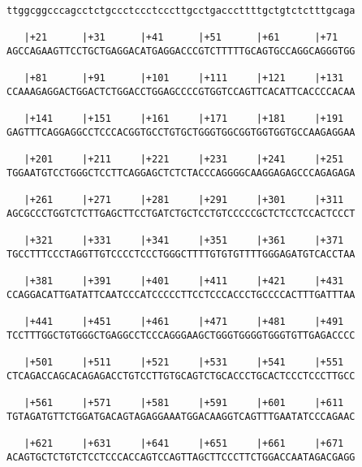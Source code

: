 \documentclass{article}
\begin{document}
\begin{Verbatim}
ttggcggcccagcctctgccctccctcccttgcctgacccttttgctgtctctttgcaga
                                                            
   |+21      |+31      |+41      |+51      |+61      |+71   
AGCCAGAAGTTCCTGCTGAGGACATGAGGACCCGTCTTTTTGCAGTGCCAGGCAGGGTGG
                                                            
   |+81      |+91      |+101     |+111     |+121     |+131  
CCAAAGAGGACTGGACTCTGGACCTGGAGCCCCGTGGTCCAGTTCACATTCACCCCACAA
                                                            
   |+141     |+151     |+161     |+171     |+181     |+191  
GAGTTTCAGGAGGCCTCCCACGGTGCCTGTGCTGGGTGGCGGTGGTGGTGCCAAGAGGAA
                                                            
   |+201     |+211     |+221     |+231     |+241     |+251  
TGGAATGTCCTGGGCTCCTTCAGGAGCTCTCTACCCAGGGGCAAGGAGAGCCCAGAGAGA
                                                            
   |+261     |+271     |+281     |+291     |+301     |+311  
AGCGCCCTGGTCTCTTGAGCTTCCTGATCTGCTCCTGTCCCCCGCTCTCCTCCACTCCCT
                                                            
   |+321     |+331     |+341     |+351     |+361     |+371  
TGCCTTTCCCTAGGTTGTCCCCTCCCTGGGCTTTTGTGTGTTTTGGGAGATGTCACCTAA
                                                            
   |+381     |+391     |+401     |+411     |+421     |+431  
CCAGGACATTGATATTCAATCCCATCCCCCTTCCTCCCACCCTGCCCCACTTTGATTTAA
                                                            
   |+441     |+451     |+461     |+471     |+481     |+491  
TCCTTTGGCTGTGGGCTGAGGCCTCCCAGGGAAGCTGGGTGGGGTGGGTGTTGAGACCCC
                                                            
   |+501     |+511     |+521     |+531     |+541     |+551  
CTCAGACCAGCACAGAGACCTGTCCTTGTGCAGTCTGCACCCTGCACTCCCTCCCTTGCC
                                                            
   |+561     |+571     |+581     |+591     |+601     |+611  
TGTAGATGTTCTGGATGACAGTAGAGGAAATGGACAAGGTCAGTTTGAATATCCCAGAAC
                                                            
   |+621     |+631     |+641     |+651     |+661     |+671  
ACAGTGCTCTGTCTCCTCCCACCAGTCCAGTTAGCTTCCCTTCTGGACCAATAGACGAGG
                                                            

\end{Verbatim}
\end{document}
